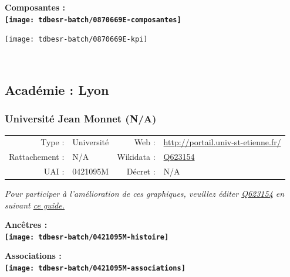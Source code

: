\documentclass[12pt,french,]{article}
\begin{document}
\hrulefill

\begin{center} \bf Composantes : \\  
\texttt{[image: tdbesr-batch/0870669E-composantes]} \end{center}

\begin{center}\texttt{[image: tdbesr-batch/0870669E-kpi]} \end{center}\checkoddpage

\ifoddpage ~\newpage \fi   

\hypertarget{acaduxe9mie-lyon}{%
\subsection{Académie : Lyon}\label{acaduxe9mie-lyon}}

\hypertarget{universituxe9-jean-monnet-na}{%
\subsubsection{Université Jean Monnet
(N/A)}\label{universituxe9-jean-monnet-na}}

\begin{tabular*}{\textwidth}{rp{5cm}rl}  
\hline  
Type : & Université & Web : &\href{http://portail.univ-st-etienne.fr/}{http://portail.univ-st-etienne.fr/} \\  
Rattachement : & N/A & Wikidata : & \href{https://www.wikidata.org/entity/Q623154}{Q623154} \\  
UAI : & 0421095M & Décret : & N/A \\  
\hline  
\end{tabular*}

\textit{\scriptsize Pour participer à l'amélioration de ces graphiques, veuillez éditer  \href{https://www.wikidata.org/entity/Q623154}{Q623154}  en suivant \href{https://github.com/cpesr/wikidataESR/blob/master/Rmd/wikidataESR.md}{ce guide.}}

\vspace{1cm}  
\begin{minipage}[b]{0.50\textwidth}\begin{center} \bf Ancêtres : \\  
\texttt{[image: tdbesr-batch/0421095M-histoire]} \end{center}\end{minipage}\begin{minipage}[b]{0.50\textwidth}\begin{center} \bf Associations : \\  
\texttt{[image: tdbesr-batch/0421095M-associations]} \end{center}\end{minipage}
\end{document}
